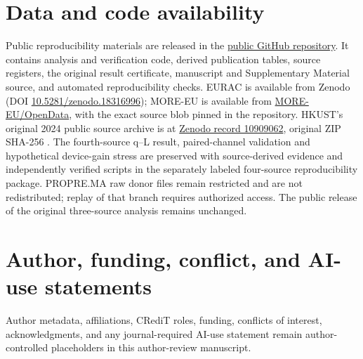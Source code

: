 \documentclass[preprint,12pt]{elsarticle}
\begin{document}
\section*{Data and code availability}
Public reproducibility materials are released in the \href{https://github.com/shaikhamalkawi-ux/pv-missing-day-decision-reliability}{public GitHub repository}. It contains analysis and verification code, derived publication tables, source registers, the original result certificate, manuscript and Supplementary Material source, and automated reproducibility checks. EURAC is available from Zenodo (DOI \href{https://doi.org/10.5281/zenodo.18316996}{10.5281/zenodo.18316996}); MORE-EU is available from \href{https://github.com/MORE-EU/OpenData}{MORE-EU/OpenData}, with the exact source blob pinned in the repository. HKUST's original 2024 public source archive is at \href{https://zenodo.org/records/10909062}{Zenodo record 10909062}, original ZIP SHA-256 \texttt{}. The fourth-source q--L result, paired-channel validation and hypothetical device-gain stress are preserved with source-derived evidence and independently verified scripts in the separately labeled four-source reproducibility package. PROPRE.MA raw donor files remain restricted and are not redistributed; replay of that branch requires authorized access. The public release of the original three-source analysis remains unchanged.

\section*{Author, funding, conflict, and AI-use statements}
Author metadata, affiliations, CRediT roles, funding, conflicts of interest, acknowledgments, and any journal-required AI-use statement remain author-controlled placeholders in this author-review manuscript.
\end{document}
